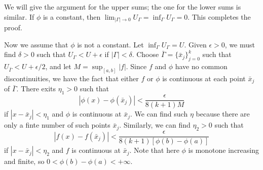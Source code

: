 \begin{exercise}{2.12}
We will give the argument for the upper sums; the one for the lower sums is similar.
If $\phi$ is a constant, then $\lim_{|\Gamma|\to0}U_\Gamma=\inf_{\Gamma}U_\Gamma=0$.
This completes the proof.

Now we assume that $\phi$ is not a constant.
Let $\inf_{\Gamma}U_\Gamma=U$. Given $\epsilon>0$, we must find $\delta>0$ such that $U_{\Gamma}<U+\epsilon$ if $|\Gamma|<\delta$. Choose $\bar{\Gamma}=\{\bar{x}_j\}_{j=0}^k$ such that $U_{\bar{\Gamma}}<U+\epsilon/2$, and let $M=\sup_{[a,b]}|f|$. Since $f$ and $\phi$ have no common discontinuities, we have the fact that  either $f$ or $\phi$ is continuous at each point $\bar{x}_j$ of $\bar{\Gamma}$. There exits $\eta_1>0$ such that
$$|\phi(x)-\phi(\bar{x}_j)|<\frac{\epsilon}{8(k+1)M}$$
if $|x-\bar{x}_j|<\eta_1$ and  $\phi$ is continuous at $\bar{x}_j$.
We can find such $\eta$ because there are only a finte number of such points $\bar{x}_j$.
Similarly, we can find $\eta_2>0$ such that
$$|f(x)-f(\bar{x}_j)|<\frac{\epsilon}{8(k+1)[\phi(b)-\phi(a)]}$$
if $|x-\bar{x}_j|<\eta_2$ and $f$ is continuous at $\bar{x}_j$.
Note that here $\phi$ is monotone increasing and finite, so $0<\phi(b)-\phi(a)<+\infty$.


\end{exercise}
